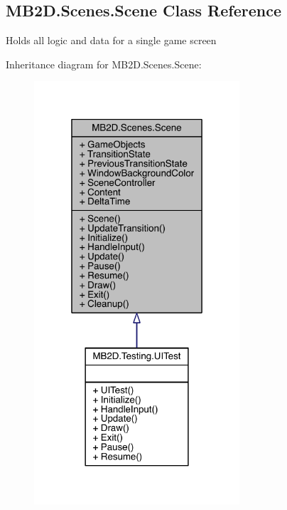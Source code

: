\hypertarget{class_m_b2_d_1_1_scenes_1_1_scene}{}\subsection{M\+B2\+D.\+Scenes.\+Scene Class Reference}
\label{class_m_b2_d_1_1_scenes_1_1_scene}


Holds all logic and data for a single game screen  




Inheritance diagram for M\+B2\+D.\+Scenes.\+Scene\+:
\nopagebreak
\begin{figure}[H]
\begin{center}
\leavevmode
\includegraphics[width=217pt]{class_m_b2_d_1_1_scenes_1_1_scene__inherit__graph}
\end{center}
\end{figure}


